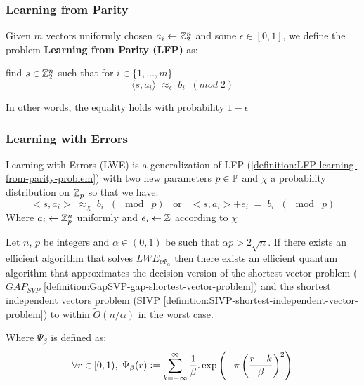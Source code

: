 \documentclass[a4paper,12pt]{article}
\begin{document}
\subsubsection{Learning from Parity}
\label{sec:org0e32782}
 \begin{definition}
  \label{definition:LFP-learning-from-parity-problem}
  Given $m$ vectors uniformly chosen  $a_i \gets \Z^n_2$ and some $\epsilon \in [0,1]$, we
  define the problem \textbf{Learning from Parity (LFP)} as:

  find $s \in \Z^n_2$ such that for $i \in \{1,\dots,m\}$
     $$ \langle{s, a_i}\rangle \; \approx_\epsilon \; b_i \;\; (mod\; 2) $$

     In other words, the equality holds with probability $1 - \epsilon$

\end{definition}

\subsubsection{Learning with Errors}
\label{sec:orga7c324d}
\begin{definition}\label{definition:LWE-learning-with-errors-problem}
  Learning with Errors (LWE) is a generalization of LFP (\ref{definition:LFP-learning-from-parity-problem}) with two new parameters $p \in \P$ and $\chi$ a probability distribution on $\Z_p$ so that we have:
\[
  <s, a_i> \; \approx_\chi \; b_i \;\; (\mod\; p) \;\;\; \text{or} \;\;\; <s, a_i> + e_i \; = \;  b_i \;\; (\mod\; p) 
    \]
     Where $a_i \gets \Z^n_p$ uniformly and $e_i \gets \Z$ according to $\chi$

\end{definition}

\begin{theorem}
  Let $n$, $p$ be integers and $\alpha \in (0, 1)$ be such that $\alpha p > 2\sqrt{n}$. If
  there exists an efficient algorithm that solves $LWE_{p \Psi_\alpha}$ then there
  exists an efficient quantum algorithm that approximates the decision version
  of the shortest vector problem ($GAP_{SVP}$ \ref{definition:GapSVP-gap-shortest-vector-problem}) and the
  shortest independent vectors problem (SIVP \ref{definition:SIVP-shortest-independent-vector-problem}) to within
  $\tilde{O}(n/\alpha)$ in the worst case.

  Where $\Psi_\beta$ is defined as:
  $$
  \forall r \in [0,1), \; \Psi_\beta(r) \defsym \sum_{k=-\infty}^\infty{\frac{1}{\beta} . \exp{\left( -\pi \left( \frac{r-k}{\beta} \right)^2 \right)}}
  $$
\end{theorem}
\end{document}
